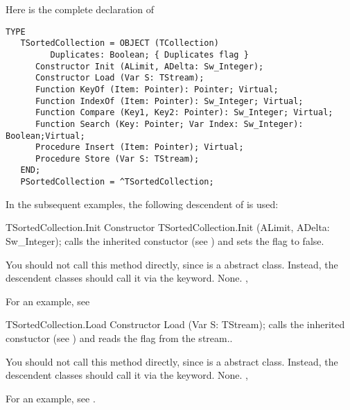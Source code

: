 Here is the complete declaration of 

\begin{verbatim}
TYPE
   TSortedCollection = OBJECT (TCollection)
         Duplicates: Boolean; { Duplicates flag }
      Constructor Init (ALimit, ADelta: Sw_Integer);
      Constructor Load (Var S: TStream);
      Function KeyOf (Item: Pointer): Pointer; Virtual;
      Function IndexOf (Item: Pointer): Sw_Integer; Virtual;
      Function Compare (Key1, Key2: Pointer): Sw_Integer; Virtual;
      Function Search (Key: Pointer; Var Index: Sw_Integer): Boolean;Virtual;
      Procedure Insert (Item: Pointer); Virtual;
      Procedure Store (Var S: TStream);
   END;
   PSortedCollection = ^TSortedCollection;
\end{verbatim}

In the subsequent examples, the following descendent of
 is used:

\html{}

\begin{procedure}{TSortedCollection.Init}
\Declaration
Constructor TSortedCollection.Init (ALimit, ADelta: Sw\_Integer);
\Description
{} calls the inherited constuctor (see ) and
sets the  flag to false.

You should not call this method directly, since  is a
abstract class. Instead, the descendent classes should call it via the
 keyword.
\Errors
None.
\SeeAlso 
{}, 
\end{procedure}

For an example, see 

\begin{procedure}{TSortedCollection.Load}
\Declaration
Constructor Load (Var S: TStream);
\Description
{} calls the inherited constuctor (see ) and
reads the  flag from the stream..

You should not call this method directly, since  is a
abstract class. Instead, the descendent classes should call it via the
 keyword.
\Errors
None.
\SeeAlso 
{}, 
\end{procedure}

For an example, see .

